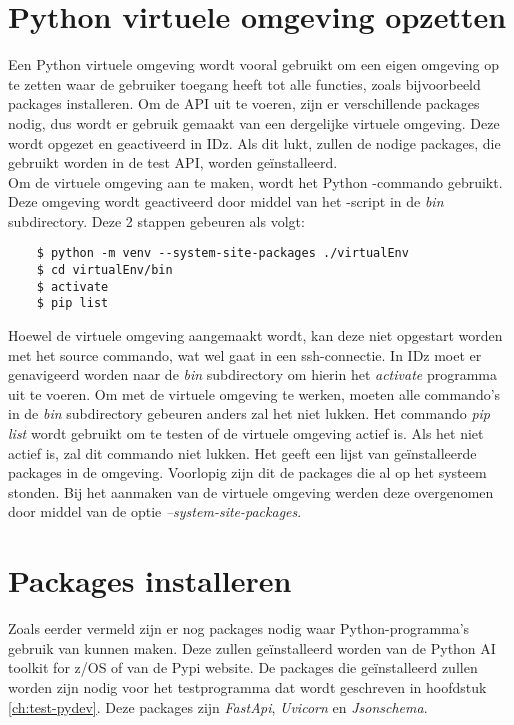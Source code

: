 \section{Python virtuele omgeving opzetten}
Een Python virtuele omgeving wordt vooral gebruikt om een eigen omgeving op te zetten waar de gebruiker toegang heeft tot alle functies, zoals bijvoorbeeld packages installeren. Om de API uit te voeren, zijn er verschillende packages nodig, dus wordt er gebruik gemaakt van een dergelijke virtuele omgeving. Deze wordt opgezet en geactiveerd in IDz. Als dit lukt, zullen de nodige packages, die gebruikt worden in de test API, worden geïnstalleerd. \\

Om de virtuele omgeving aan te maken, wordt het Python -commando gebruikt. Deze omgeving wordt geactiveerd door middel van het -script in de \textit{bin} subdirectory. Deze 2 stappen gebeuren als volgt:

\begin{lstlisting}
    $ python -m venv --system-site-packages ./virtualEnv
    $ cd virtualEnv/bin
    $ activate
    $ pip list
\end{lstlisting}

Hoewel de virtuele omgeving aangemaakt wordt, kan deze niet opgestart worden met het source commando, wat wel gaat in een ssh-connectie. In IDz moet er genavigeerd worden naar de \textit{bin} subdirectory om hierin het \textit{activate} programma uit te voeren. Om met de virtuele omgeving te werken, moeten alle commando's in de \textit{bin} subdirectory gebeuren anders zal het niet lukken.
Het commando \textit{pip list} wordt gebruikt om te testen of de virtuele omgeving actief is. Als het niet actief is, zal dit commando niet lukken. Het geeft een lijst van geïnstalleerde packages in de omgeving. Voorlopig zijn dit de packages die al op het systeem stonden. Bij het aanmaken van de virtuele omgeving werden deze overgenomen door middel van de optie \textit{--system-site-packages}.

\section{Packages installeren}
Zoals eerder vermeld zijn er nog packages nodig waar Python-programma's gebruik van kunnen maken. Deze zullen geïnstalleerd worden van de Python AI toolkit for z/OS of van de Pypi website. De packages die geïnstalleerd zullen worden zijn nodig voor het testprogramma dat wordt geschreven in hoofdstuk \ref{ch:test-pydev}. Deze packages zijn \textit{FastApi}, \textit{Uvicorn} en \textit{Jsonschema}. \\

